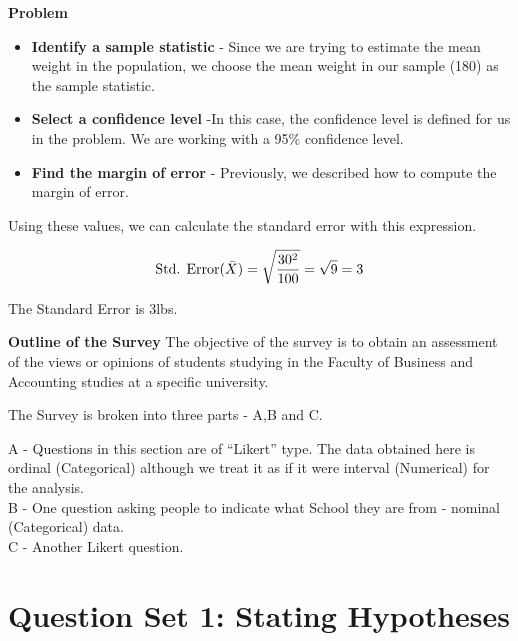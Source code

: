 \noindent  \textbf{Problem}

\begin{itemize}
\item
\textbf{Identify a sample statistic} - Since we are trying to estimate the mean weight in the population, we choose the mean weight in our sample (180) as the sample statistic.


\item \textbf{Select a confidence level}  -In this case, the confidence level is defined for us in the problem. We are working with a 95\% confidence level.


\item \textbf{Find the margin of error} - Previously, we described how to compute the margin of error.
\end{itemize}





Using these values, we can calculate the standard error with this expression.

\vspace{0.1cm}
\[
\mbox{Std. Error}(\bar{X})  = \sqrt{{30^2\over 100}} = \sqrt{9}
= 3\]

\vspace{0.1cm}

The Standard Error is 3lbs.



\noindent  \textbf{Outline of the Survey}
The objective of the survey is to obtain an assessment of the views or opinions of students studying in the Faculty of Business and Accounting studies at a specific university.

\vspace{0.4cm}

The Survey is broken into three parts - A,B and C. \\ \vspace{0.2cm}

A - Questions in this section are of ``Likert'' type. The data obtained here is ordinal (Categorical) although we treat it as if it were interval (Numerical) for the analysis.\\
\vspace{0.2cm}
B - One question asking people to indicate what School they are from - nominal (Categorical) data.\\
\vspace{0.2cm}
C - Another Likert question.




\newpage
\section*{Question Set 1: Stating Hypotheses}


